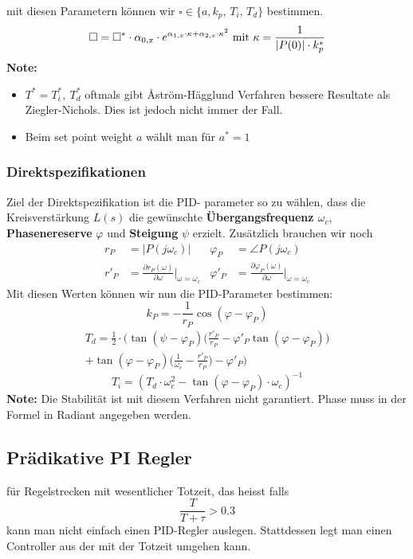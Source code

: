             mit diesen Parametern können wir $\square \in \{a, k_p,\, T_i,\, T_d\}$ bestimmen.
            \[ \square = \square^* \cdot \alpha_{0,x} \cdot e^{\alpha_{1,x} \cdot \kappa + \alpha_{2,x} \cdot \kappa^2}
            \ \textnormal{mit} \ \kappa = \frac{1}{|P(0)| \cdot k_p^*} \]
            \textbf{Note:}
            \begin{itemize}
                \item $T^* = T_i^*,\  T_d^*$ oftmals gibt \r{A}ström-Hägglund Verfahren bessere Resultate als Ziegler-Nichols. Dies ist jedoch nicht immer der Fall. 
                \item Beim set point weight $a$ wählt man für $a^* = 1$ 
            \end{itemize}
            
    \subsubsection{Direktspezifikationen} 
        Ziel der Direktspezifikation ist die PID- parameter so zu wählen, dass die Kreisverstärkung $L(s)$ die gewünschte \textbf{Übergangsfrequenz $\omega_c$}, \textbf{Phasenereserve} $\varphi$ und \textbf{Steigung} $\psi$ erzielt. Zusätzlich brauchen wir noch 
        \begin{align*}
        r_P &= |P(j\omega_c)|   &   \varphi_P &= \angle P(j\omega_c)\\
        r'_P &= \frac{\partial r_P(\omega)}{\partial\omega}\Bigg|_{\omega=\omega_c} & \varphi'_P &= \frac{\partial \varphi_P(\omega)}{\partial\omega}\Bigg |_{\omega=\omega_c}
        \end{align*}
        Mit diesen Werten können wir nun die PID-Parameter bestimmen:
        \[k_P = - \frac{1}{r_P}\cos(\varphi-\varphi_P)\]
        \begin{multline*}
        T_d =\frac{1}{2}\cdot\Bigg(\tan(\psi-\varphi_P)\Bigg(\frac{r'_P}{r_P}-\varphi'_P\tan(\varphi-\varphi_P)\Bigg)\\ + \tan(\varphi-\varphi_P) \Bigg(\frac{1}{\omega_c}-\frac{r'_P}{r_P}\Bigg)- \varphi'_P\Bigg)
        \end{multline*}
        \[T_i = (T_d\cdot \omega_c^2 - \tan(\varphi-\varphi_P)\cdot \omega_c)^{-1}\]
        \textbf{Note:} Die Stabilität ist mit diesem Verfahren nicht garantiert. Phase muss in der Formel in Radiant angegeben werden. 
\subsection{Prädikative PI Regler}
    für Regelstrecken mit wesentlicher Totzeit, das heisst falls 
    \[\frac{T}{T+\tau}>0.3\]
    kann man nicht einfach einen PID-Regler auslegen. Stattdessen legt man einen Controller aus der mit der Totzeit umgehen kann. 

